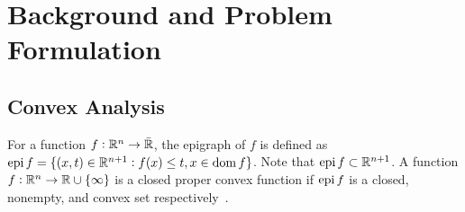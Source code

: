\section{Background and Problem Formulation}
\label{sec:background-and-problem-formulation}

% 






\subsection{Convex Analysis}
\label{subsec:convex-analysis}

For a function $f: \mathbb{R}^n \rightarrow \bar{\mathbb{R}}$, the epigraph of $f$ is defined as $\operatorname{epi}{f} = \{(x, t) \in \mathbb{R}^{n+1}: f(x) \leq t, x \in \operatorname{dom}{f}\}$.
Note that $\operatorname{epi}{f} \subset \mathbb{R}^{n+1}$.
A function $f: \mathbb{R}^n \rightarrow \mathbb{R} \cup \{\infty\}$ is a closed proper convex function if $\operatorname{epi}{f}$ is a closed, nonempty, and convex set respectively~\cite[Sec.~4, Sec.~7]{rockafellar1997convex}.


